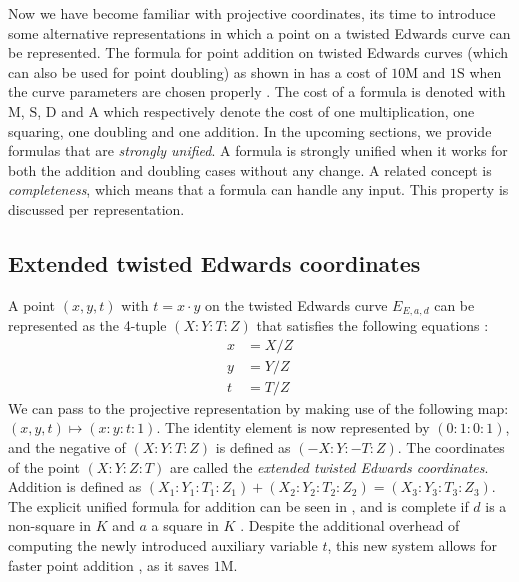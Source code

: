 \vspace{5mm} \noindent
%
Now we have become familiar with projective coordinates, its time to introduce some alternative representations in which a point on a twisted Edwards curve can be represented.
The formula for point addition on twisted Edwards curves (which can also be used for point doubling) as shown in  has a cost of $10\bm{\mathrm{M}}$ and $1\bm{\mathrm{S}}$ when the curve parameters are chosen properly \cite{bernstein2007inverted}.
The cost of a formula is denoted with $\bm{\mathrm{M}}$, $\bm{\mathrm{S}}$, $\bm{\mathrm{D}}$ and $\bm{\mathrm{A}}$ which respectively denote the cost of one multiplication, one squaring, one doubling and one addition. 
In the upcoming sections, we provide formulas that are \emph{strongly unified}.
A formula is strongly unified when it works for both the addition and doubling cases without any change.
A related concept is \emph{completeness}, which means that a formula can handle any input.
This property is discussed per representation.
%
\subsection{Extended twisted Edwards coordinates} \label{subsec: Extended twisted Edwards coordinates}
A point $(x, y, t)$ with $t=x \cdot y$ on the twisted Edwards curve $E_{E,a,d}$ can be represented as the 4-tuple $(X:Y:T:Z)$ that satisfies the following equations \cite{hisil2008twisted}:
%
\begin{align*}
x &= X/Z \\
y &= Y/Z \\
t &= T/Z
\end{align*}
%
We can pass to the projective representation by making use of the following map: $(x, y, t) \mapsto (x:y:t:1)$.
The identity element is now represented by $(0: 1: 0: 1)$, and the negative of $(X:Y:T:Z)$ is defined as $(-X:Y:-T:Z)$.
The coordinates of the point $(X:Y:Z:T)$ are called the \emph{extended twisted Edwards coordinates}.
Addition is defined as $(X_1 : Y_1 : T_1 : Z_1) + (X_2 : Y_2 : T_2 : Z_2) = (X_3 : Y_3 : T_3 : Z_3)$.
The explicit unified formula for addition can be seen in , and is complete if $d$ is a non-square in $K$ and $a$ a square in $K$ \cite{hisil2008twisted}.
Despite the additional overhead of computing the newly introduced auxiliary variable $t$, this new system allows for faster point addition \cite{hisil2008twisted}, as it saves $1\bm{\mathrm{M}}$.

